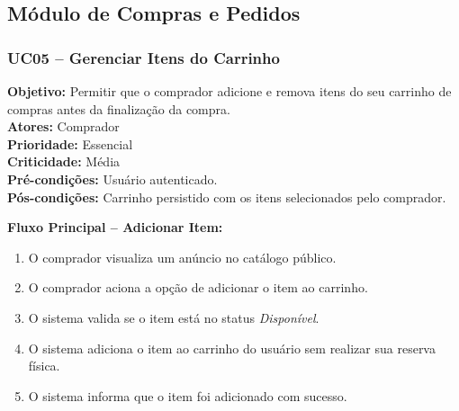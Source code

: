 ﻿\documentclass[12pt,a4paper]{article}
\begin{document}
\subsection{Módulo de Compras e Pedidos}

\subsubsection{UC05 – Gerenciar Itens do Carrinho}
\label{uc:09}
\noindent\textbf{Objetivo:} Permitir que o comprador adicione e remova itens do seu carrinho de compras antes da finalização da compra.\\
\textbf{Atores:} Comprador\\
\textbf{Prioridade:} Essencial\\
\textbf{Criticidade:} Média\\
\textbf{Pré-condições:} Usuário autenticado.\\
\textbf{Pós-condições:} Carrinho persistido com os itens selecionados pelo comprador.

\vspace{0.5em}
\noindent\textbf{Fluxo Principal – Adicionar Item:}
\begin{enumerate}[label=\arabic*.]
    \item O comprador visualiza um anúncio no catálogo público.
    \item O comprador aciona a opção de adicionar o item ao carrinho.
    \item O sistema valida se o item está no status \textit{Disponível}.
    \item O sistema adiciona o item ao carrinho do usuário sem realizar sua reserva física.
    \item O sistema informa que o item foi adicionado com sucesso.
\end{enumerate}
\end{document}
